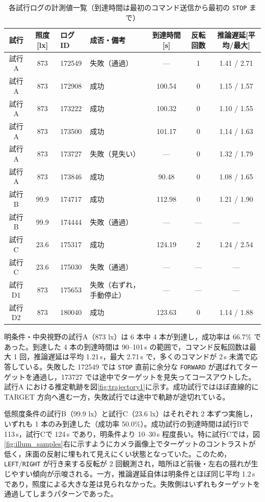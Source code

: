 \documentclass[a4paper,11pt]{ltjsreport}
\begin{document}
\begin{table}[htbp]
  \centering
  \caption{各試行ログの計測値一覧（到達時間は最初のコマンド送信から最初の \texttt{STOP} まで）}
  \label{tab:summary}
  \footnotesize
  \setlength{\tabcolsep}{2.5pt}
  \setlength{\arrayrulewidth}{0.5pt}
  \renewcommand{\arraystretch}{1.1}
  \noindent\begin{tabularx}{\linewidth}{|c|c|l|X|c|c|c|}
    \hline
    試行 & 照度 [lx] & ログID & 成否・備考 & 到達時間 [s] & 反転回数 & 推論遅延[平均/最大] \\
    \hline
    試行A & 873 & 172549 & 失敗（通過） & --- & 1 & 1.41 / 2.71 \\
    試行A & 873 & 172908 & 成功 & 100.54 & 0 & 1.15 / 1.57 \\
    試行A & 873 & 173222 & 成功 & 100.32 & 0 & 1.10 / 1.55 \\
    試行A & 873 & 173500 & 成功 & 101.17 & 0 & 1.14 / 1.63 \\
    試行A & 873 & 173727 & 失敗（見失い） & ---  & 0 & 1.32 / 1.79 \\
    試行A & 873 & 173846 & 成功 & 90.48  & 0 & 1.08 / 1.65 \\
    \hline
    試行B & 99.9 & 174717 & 成功 & 112.98 & 0 & 1.21 / 1.90 \\
    試行B & 99.9 & 174444 & 失敗（通過） & --- & --- & --- \\
    \hline
    試行C & 23.6 & 175317 & 成功 & 124.19 & 2 & 1.24 / 2.54 \\
    試行C & 23.6 & 175030 & 失敗（通過） & --- & --- & --- \\
    \hline
    試行D1 & 873 & 175653 & 失敗（右ずれ，手動停止） & --- & --- & --- \\
    \hline
    試行D2 & 873 & 180040 & 成功 & 123.63 & 0 & 1.14 / 1.88 \\
    \hline
  \end{tabularx}
\end{table}

明条件・中央視野の試行A（873 lx）は 6 本中 4 本が到達し，成功率は 66.7\% であった。到達した 4 本の到達時間は 90--101\,s の範囲で，コマンド反転回数は最大 1 回，推論遅延は平均 1.21\,s，最大 2.71\,s で，多くのコマンドが 2\,s 未満で応答している。失敗した 172549 では \texttt{STOP} 直前に余分な \texttt{FORWARD} が選ばれてターゲットを通過し，173727 では途中でターゲットを見失ってコースアウトした。試行A における推定軌跡を図\ref{fig:trajectory1}に示す。成功試行ではほぼ直線的に TARGET 方向へ進む一方，失敗試行では途中で軌跡が途切れている。

低照度条件の試行B（99.9 lx）と試行C（23.6 lx）はそれぞれ 2 本ずつ実施し，いずれも 1 本のみ到達した（成功率 50.0\%）。成功試行の到達時間は試行Bで 113\,s，試行Cで 124\,s であり，明条件より 10--30\,s 程度長い。特に試行Cでは，図\ref{fig:illum_samples}右に示すようにカメラ画像上でターゲットのコントラストが低く，床面の反射に埋もれて見えにくい状態となっていた。このため，\texttt{LEFT}/\texttt{RIGHT} が行き来する反転が 2 回観測され，暗所ほど前後・左右の揺れが生じやすい傾向が示唆される。一方，推論遅延自体は明条件とほぼ同じ平均 1.2\,s であり，照度による大きな差は見られなかった。失敗側はいずれもターゲットを通過してしまうパターンであった。
\end{document}
